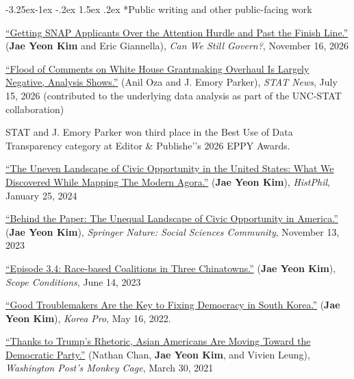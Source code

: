 \documentclass[10pt, letterpaper]{article}
\makeatletter
\renewcommand\subsection{\@startsection{subsection}{2}{\z@}%
  {-3.25ex\@plus -1ex \@minus -.2ex}%
  {1.5ex \@plus .2ex}%
  {\normalfont\large\bfseries\color{cvnavy}}}
\renewenvironment{itemize}{
\begin{list}{}{
        \setlength{\leftmargin}{1.5em}
        \setlength{\itemsep}{0.10em}
        \setlength{\parskip}{0pt}
        \setlength{\parsep}{0.10em}
    }
}{
\end{list}
}
\makeatother
\begin{document}
\subsection*{Public writing and other public-facing work} 
\begin{etaremune}
    \item \href{https://donmoynihan.substack.com/p/nudges-help-applicants-complete-on}{``Getting SNAP Applicants Over the Attention Hurdle and Past the Finish Line.''} (\textbf{Jae Yeon Kim} and Eric Giannella), \textit{Can We Still Govern?}, November 16, 2026
    \item \href{https://www.statnews.com/2026/07/15/trump-omb-grant-funding-proposal-comments-95-percent-opposed/}{``Flood of Comments on White House Grantmaking Overhaul Is Largely Negative, Analysis Shows.''} (Anil Oza and J. Emory Parker), \textit{STAT News}, July 15, 2026 (contributed to the underlying data analysis as part of the UNC-STAT collaboration)
    \begin{itemize}
    \item STAT and J. Emory Parker won third place in the Best Use of Data Transparency category at Editor \& Publishe'’s 2026 EPPY Awards.
    \end{itemize}
    \item \href{https://histphil.org/2024/01/25/the-uneven-landscape-of-civic-opportunity-in-the-united-states-what-we-discovered-while-mapping-the-modern-agora/}{``The Uneven Landscape of Civic Opportunity in the United States: What We Discovered While Mapping The Modern Agora.''} (\textbf{Jae Yeon Kim}), \textit{HistPhil}, January 25, 2024
    \item \href{https://go.nature.com/45qrXpz}{``Behind the Paper: The Unequal Landscape of Civic Opportunity in America.''} (\textbf{Jae Yeon Kim}), \textit{Springer Nature: Social Sciences Community}, November 13, 2023 \item \href{https://www.scopeconditionspodcast.com/episodes/episode-34-comparing-asian-coalitions-across-three-chinatowns-with-jae-yeon-kim?fbclid=IwAR1_zGE57lmVDhg8uQA8FfDbdzOybB704Q2m0VQkkhfWtB7Asj29I_-mxPM}{``Episode 3.4: Race-based Coalitions in Three Chinatowns.''} (\textbf{Jae Yeon Kim}), \textit{Scope Conditions}, June 14, 2023
    \item \href{https://www.nknews.org/pro/good-troublemakers-are-the-key-to-fixing-democracy-in-south-korea/?t=1660440015387}{``Good Troublemakers Are the Key to Fixing Democracy in South Korea.''} (\textbf{Jae Yeon Kim}), \textit{Korea Pro}, May 16, 2022.
    \item \href{https://www.washingtonpost.com/politics/2021/03/30/thanks-trumps-rhetoric-asian-americans-are-moving-toward-the-democratic-party/?utm_campaign=wp_monkeycage&utm_medium=social&utm_source=twitter&tid=sm_tw_monkeycage}{``Thanks to Trump's Rhetoric, Asian Americans Are Moving Toward the Democratic Party.''} (Nathan Chan, \textbf{Jae Yeon Kim}, and Vivien Leung), \textit{Washington Post's Monkey Cage}, March 30, 2021

\end{etaremune}
\end{document}
